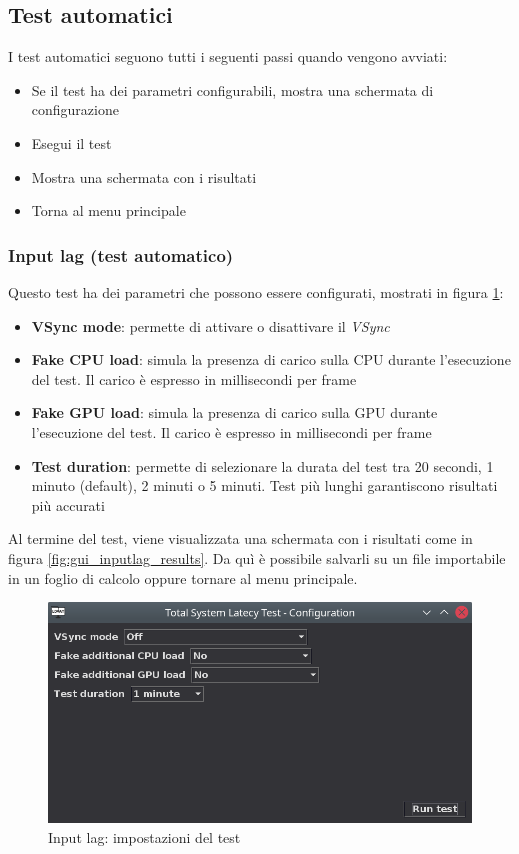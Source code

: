 \subsection{Test automatici}
I test automatici seguono tutti i seguenti passi quando vengono avviati:\begin{itemize}
	\item Se il test ha dei parametri configurabili, mostra una schermata di configurazione
	\item Esegui il test
	\item Mostra una schermata con i risultati
	\item Torna al menu principale
\end{itemize}

\subsubsection{Input lag (test automatico)}
Questo test ha dei parametri che possono essere configurati, mostrati in figura \ref{fig:gui_inputlag_settings}:\begin{itemize}
	\item \textbf{VSync mode}: permette di attivare o disattivare il \textit{VSync}
	\item \textbf{Fake CPU load}: simula la presenza di carico sulla CPU durante l'esecuzione del test. Il carico è espresso in millisecondi per frame
	\item \textbf{Fake GPU load}: simula la presenza di carico sulla GPU durante l'esecuzione del test. Il carico è espresso in millisecondi per frame
	\item \textbf{Test duration}: permette di selezionare la durata del test tra 20 secondi, 1 minuto (default), 2 minuti o 5 minuti. Test più lunghi garantiscono risultati più accurati
\end{itemize}

Al termine del test, viene visualizzata una schermata con i risultati come in figura \ref{fig:gui_inputlag_results}. Da quì è possibile salvarli su un file importabile in un foglio di calcolo oppure tornare al menu principale.

\begin{figure}[H]
	\centering
	\includegraphics[width=.8\textwidth]{Applicazione_files/gui_inputlag_settings.png}
	\caption{Input lag: impostazioni del test}
	\label{fig:gui_inputlag_settings}
\end{figure}

